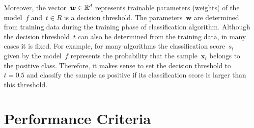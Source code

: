 Moreover, the vector~$\bm{w} \in \mathbb{R}^d$ represents trainable parameters (weights) of the model~$f$ and~$t \in R$ is a decision threshold. The parameters~$\bm{w}$ are determined from training data during the training phase of classification algorithm. Although the decision threshold~$t$ can also be determined from the training data, in many cases it is fixed. For example, for many algorithms the classification score~$s_i$ given by the model~$f$ represents the probability that the sample~$\bm{x}_i$ belongs to the positive class. Therefore, it makes sense to set the decision threshold to~$t = 0.5$ and classify the sample as positive if its classification score is larger than this threshold. 

\section{Performance Criteria}


